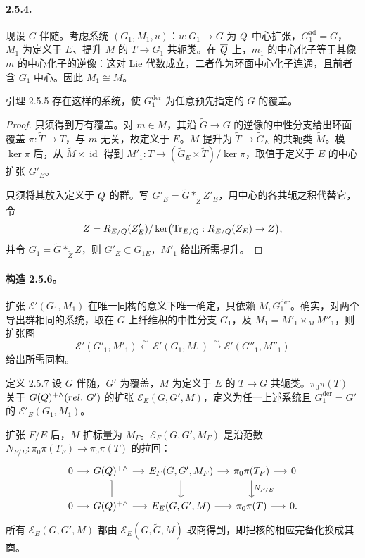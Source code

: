\paragraph*{2.5.4.} 现设 $G$ 伴随。考虑系统 $(G_1,M_1,u)$：$u:G_1\to G$ 为 $Q$ 中心扩张，$G_1^{\mathrm{ad}}=G$，$M_1$ 为定义于 $E$、提升 $M$ 的 $T\to G_1$ 共轭类。在 $\overline{Q}$ 上，$m_1$ 的中心化子等于其像 $m$ 的中心化子的逆像：这对 Lie 代数成立，二者作为环面中心化子连通，且前者含 $G_1$ 中心。因此 $M_1\cong M$。
\begin{originaltheorem}{引理 2.5.5}
存在这样的系统，使 $G_1^{\mathrm{der}}$ 为任意预先指定的 $G$ 的覆盖。
\end{originaltheorem}
\begin{proof}
只须得到万有覆盖。对 $m\in M$，其沿 $\widetilde G\to G$ 的逆像的中性分支给出环面覆盖 $\pi:\widetilde T\to T$，与 $m$ 无关，故定义于 $E$。$M$ 提升为 $\widetilde T\to\widetilde G_E$ 的共轭类 $\widetilde M$。模 $\ker\pi$ 后，从 $\widetilde M\times\operatorname{id}$ 得到 $M'_1:T\to(\widetilde G_E\times\widetilde T)/\ker\pi$，取值于定义于 $E$ 的中心扩张 $G'_E$。

只须将其放入定义于 $Q$ 的群。写 $G'_E=\widetilde G*_{{\widetilde Z}}Z'_E$，用中心的各共轭之积代替它，令
\[
 Z=R_{E/Q}(Z'_E)/\ker\bigl(\operatorname{Tr}_{E/Q}:R_{E/Q}(Z_E)\to Z\bigr),
\]
并令 $G_1=\widetilde G*_{\widetilde Z}Z$，则 $G'_E\subset G_{1E}$，$M'_1$ 给出所需提升。
\end{proof}
\paragraph*{构造 2.5.6。} 扩张 $\mathcal E'(G_1,M_1)$ 在唯一同构的意义下唯一确定，只依赖 $M,G_1^{\mathrm{der}}$。确实，对两个导出群相同的系统，取在 $G$ 上纤维积的中性分支 $G_1$，及 $M_1=M'_1\times_M M''_1$，则扩张图
\[
 \mathcal E'(G'_1,M'_1)\xleftarrow{\sim}\mathcal E'(G_1,M_1)
 \xrightarrow{\sim}\mathcal E'(G''_1,M''_1)
\]
给出所需同构。
\begin{originaltheorem}{定义 2.5.7}
设 $G$ 伴随，$G'$ 为覆盖，$M$ 为定义于 $E$ 的 $T\to G$ 共轭类。$\pi_0\pi(T)$ 关于 $G(\Q)^{+\wedge}(\mathrm{rel.}\ G')$ 的扩张 $\mathcal E_E(G,G',M)$，定义为任一上述系统且 $G_1^{\mathrm{der}}=G'$ 的 $\mathcal E'_E(G_1,M_1)$。
\end{originaltheorem}
扩张 $F/E$ 后，$M$ 扩标量为 $M_F$。$\mathcal E_F(G,G',M_F)$ 是沿范数 $N_{F/E}:\pi_0\pi(T_F)\to\pi_0\pi(T)$ 的拉回：
\[
 \begin{tikzcd}[column sep=small]
 0\arrow[r]&G(\Q)^{+\wedge}\arrow[r]\arrow[d,equal]&\mathcal E_F(G,G',M_F)\arrow[r]\arrow[d]&\pi_0\pi(T_F)\arrow[r]\arrow[d,"N_{F/E}"]&0\\
 0\arrow[r]&G(\Q)^{+\wedge}\arrow[r]&\mathcal E_E(G,G',M)\arrow[r]&\pi_0\pi(T)\arrow[r]&0.
 \end{tikzcd}
\]
所有 $\mathcal E_E(G,G',M)$ 都由 $\mathcal E_E(G,\widetilde G,M)$ 取商得到，即把核的相应完备化换成其商。
